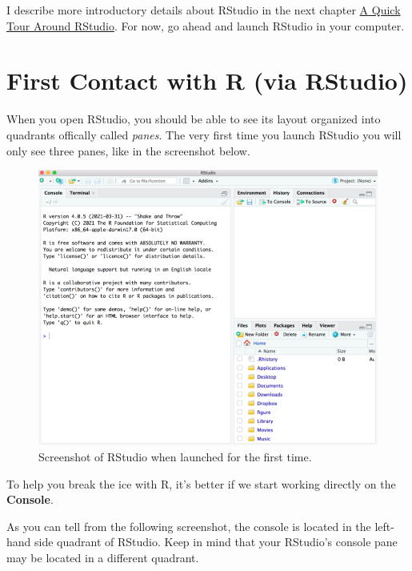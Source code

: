 \documentclass[
]{book}
\begin{document}
I describe more introductory details about RStudio in the next chapter
\protect\hyperlink{rstudio}{A Quick Tour Around RStudio}. For now, go ahead and launch RStudio
in your computer.

\hypertarget{first-contact-with-r-via-rstudio}{%
\section{First Contact with R (via RStudio)}\label{first-contact-with-r-via-rstudio}}

When you open RStudio, you should be able to see its layout organized into
quadrants offically called \emph{panes}. The very first time you launch RStudio you
will only see three panes, like in the screenshot below.

\begin{figure}

{\centering \includegraphics[width=0.7\linewidth]{images/rstudio/rstudio-launch-first-time} 

}

\caption{Screenshot of RStudio when launched for the first time.}\label{fig:unnamed-chunk-14}
\end{figure}

To help you break the ice with R, it's better if we start working directly
on the \textbf{Console}.

As you can tell from the following screenshot, the console is located in the
left-hand side quadrant of RStudio. Keep in mind that your RStudio's console
pane may be located in a different quadrant.
\end{document}
